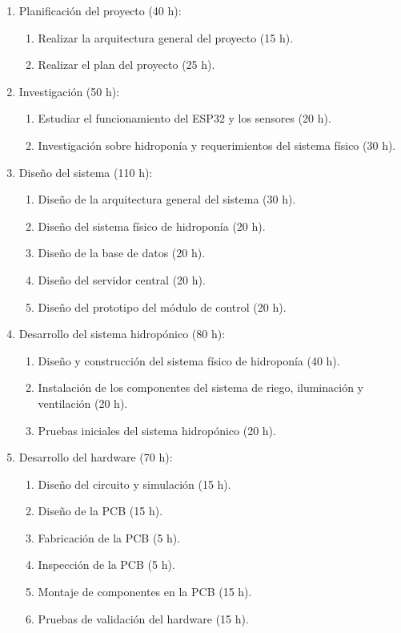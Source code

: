 \documentclass[
11pt, %
]{charter}
\begin{document}
\begin{enumerate}
\item Planificación del proyecto (40 h):
	\begin{enumerate}
	\item Realizar la arquitectura general del proyecto (15 h).
	\item Realizar el plan del proyecto (25 h).
	\end{enumerate}
\item Investigación (50 h):
	\begin{enumerate}
	\item Estudiar el funcionamiento del ESP32 y los sensores (20 h).
	\item Investigación sobre hidroponía y requerimientos del sistema físico (30 h).
	\end{enumerate}
\item Diseño del sistema (110 h):
	\begin{enumerate}
	\item Diseño de la arquitectura general del sistema (30 h).
	\item Diseño del sistema físico de hidroponía (20 h).
	\item Diseño de la base de datos (20 h).
	\item Diseño del servidor central (20 h).
	\item Diseño del prototipo del módulo de control (20 h).
	\end{enumerate}
\item Desarrollo del sistema hidropónico (80 h):
	\begin{enumerate}
	\item Diseño y construcción del sistema físico de hidroponía (40 h).
	\item Instalación de los componentes del sistema de riego, iluminación y ventilación (20 h).
	\item Pruebas iniciales del sistema hidropónico (20 h).
	\end{enumerate}
\item Desarrollo del hardware (70 h):
	\begin{enumerate}
	\item Diseño del circuito y simulación (15 h).
	\item Diseño de la PCB (15 h).
	\item Fabricación de la PCB (5 h).
	\item Inspección de la PCB (5 h).
	\item Montaje de componentes en la PCB (15 h).
	\item Pruebas de validación del hardware (15 h).

\end{enumerate}
\end{enumerate}
\end{document}
